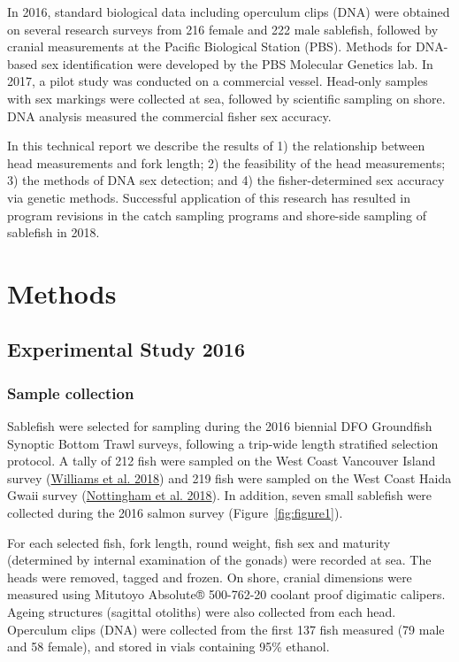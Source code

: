 \documentclass[12pt]{article}\usepackage[]{graphicx}\usepackage[]{color}
\begin{document}
In 2016, standard biological data including operculum clips (DNA) were obtained on several research surveys from 216 female and 222 male sablefish, followed by cranial measurements at the Pacific Biological Station (PBS). Methods for DNA-based sex identification were developed by the PBS Molecular Genetics lab. In 2017, a pilot study was conducted on a commercial vessel. Head-only samples with sex markings were collected at sea, followed by scientific sampling on shore. DNA analysis measured the commercial fisher sex accuracy.

In this technical report we describe the results of 1) the relationship between head measurements and fork length; 2) the feasibility of the head measurements; 3) the methods of DNA sex detection; and 4) the fisher-determined sex accuracy via genetic methods. Successful application of this research has resulted in program revisions in the catch sampling programs and shore-side sampling of sablefish in 2018.

\hypertarget{methods}{%
\section{Methods}\label{methods}}

\hypertarget{experimental-study-2016}{%
\subsection{Experimental Study 2016}\label{experimental-study-2016}}

\hypertarget{sample-collection}{%
\subsubsection{Sample collection}\label{sample-collection}}

Sablefish were selected for sampling during the 2016 biennial DFO Groundfish Synoptic Bottom Trawl surveys, following a trip-wide length stratified selection protocol. A tally of 212 fish were sampled on the West Coast Vancouver Island survey (\protect\hyperlink{ref-Williams2018}{Williams et al. 2018}) and 219 fish were sampled on the West Coast Haida Gwaii survey (\protect\hyperlink{ref-Nottingham2018}{Nottingham et al. 2018}). In addition, seven small sablefish were collected during the 2016 salmon survey (Figure~\ref{fig:figure1}).

For each selected fish, fork length, round weight, fish sex and maturity (determined by internal examination of the gonads) were recorded at sea. The heads were removed, tagged and frozen. On shore, cranial dimensions were measured using Mitutoyo Absolute® 500-762-20 coolant proof digimatic calipers. Ageing structures (sagittal otoliths) were also collected from each head. Operculum clips (DNA) were collected from the first 137 fish measured (79 male and 58 female), and stored in vials containing 95\% ethanol.
\end{document}
